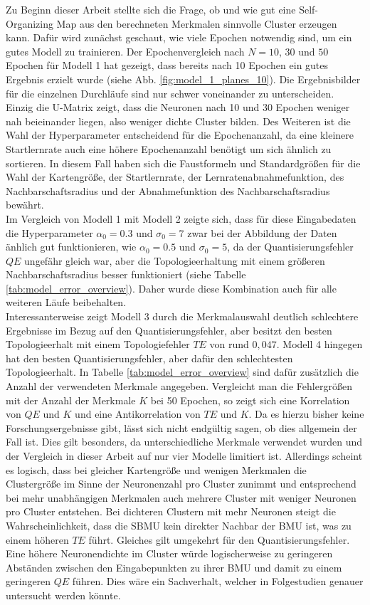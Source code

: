 Zu Beginn dieser Arbeit stellte sich die Frage, ob und wie gut eine Self-Organizing Map aus den berechneten Merkmalen sinnvolle Cluster erzeugen kann. Dafür wird zunächst geschaut, wie viele Epochen notwendig sind, um ein gutes Modell zu trainieren. Der Epochenvergleich nach $N = 10$, $30$ und $50$ Epochen für Modell 1 hat gezeigt, dass bereits nach 10 Epochen ein gutes Ergebnis erzielt wurde (siehe Abb. \ref{fig:model_1_planes_10}). Die Ergebnisbilder für die einzelnen Durchläufe sind nur schwer voneinander zu unterscheiden. Einzig die U-Matrix zeigt, dass die Neuronen nach 10 und 30 Epochen weniger nah beieinander liegen, also weniger dichte Cluster bilden. Des Weiteren ist die Wahl der Hyperparameter entscheidend für die Epochenanzahl, da eine kleinere Startlernrate auch eine höhere Epochenanzahl benötigt um sich ähnlich zu sortieren. In diesem Fall haben sich die Faustformeln und Standardgrößen für die Wahl der Kartengröße, der Startlernrate, der Lernratenabnahmefunktion, des Nachbarschaftsradius und der Abnahmefunktion des Nachbarschaftsradius bewährt.\\
Im Vergleich von Modell 1 mit Modell 2 zeigte sich, dass für diese Eingabedaten die Hyperparameter $\alpha_0 = 0.3$ und $\sigma_0 = 7$ zwar bei der Abbildung der Daten änhlich gut funktionieren, wie $\alpha_0 = 0.5$ und $\sigma_0 = 5$, da der Quantisierungsfehler $QE$ ungefähr gleich war, aber die Topologieerhaltung mit einem größeren Nachbarschaftsradius besser funktioniert (siehe Tabelle \ref{tab:model_error_overview}). Daher wurde diese Kombination auch für alle weiteren Läufe beibehalten.\\
Interessanterweise zeigt Modell 3 durch die Merkmalauswahl deutlich schlechtere Ergebnisse im Bezug auf den Quantisierungsfehler, aber besitzt den besten Topologieerhalt mit einem Topologiefehler $TE$ von rund $0,047$. Modell 4 hingegen hat den besten Quantisierungsfehler, aber dafür den schlechtesten Topologieerhalt. In Tabelle \ref{tab:model_error_overview} sind dafür zusätzlich die Anzahl der verwendeten Merkmale angegeben. Vergleicht man die Fehlergrößen mit der Anzahl der Merkmale $K$ bei 50 Epochen, so zeigt sich eine Korrelation von $QE$ und $K$ und eine Antikorrelation von $TE$ und $K$. Da es hierzu bisher keine Forschungsergebnisse gibt, lässt sich nicht endgültig sagen, ob dies allgemein der Fall ist. Dies gilt besonders, da unterschiedliche Merkmale verwendet wurden und der Vergleich in dieser Arbeit auf nur vier Modelle limitiert ist. Allerdings scheint es logisch, dass bei gleicher Kartengröße und wenigen Merkmalen die Clustergröße im Sinne der Neuronenzahl pro Cluster zunimmt und entsprechend bei mehr unabhängigen Merkmalen auch mehrere Cluster mit weniger Neuronen pro Cluster entstehen. Bei dichteren Clustern mit mehr Neuronen steigt die Wahrscheinlichkeit, dass die SBMU kein direkter Nachbar der BMU ist, was zu einem höheren $TE$ führt. Gleiches gilt umgekehrt für den Quantisierungsfehler. Eine höhere Neuronendichte im Cluster würde logischerweise zu geringeren Abständen zwischen den Eingabepunkten zu ihrer BMU und damit zu einem geringeren $QE$ führen. Dies wäre ein Sachverhalt, welcher in Folgestudien genauer untersucht werden könnte.\\
